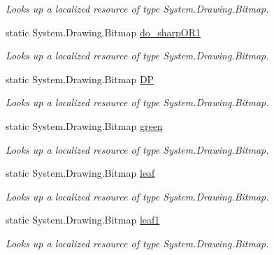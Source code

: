 \begin{DoxyCompactItemize}
\begin{DoxyCompactList}\small\item\em Looks up a localized resource of type System.\+Drawing.\+Bitmap. \end{DoxyCompactList}\item 
static System.\+Drawing.\+Bitmap \hyperlink{classWildlifeTrackingApp_1_1Properties_1_1Resources_ab919b7600d84247495b540af2c9f92be}{do\+\_\+sharp\+O\+R1}
\begin{DoxyCompactList}\small\item\em Looks up a localized resource of type System.\+Drawing.\+Bitmap. \end{DoxyCompactList}\item 
static System.\+Drawing.\+Bitmap \hyperlink{classWildlifeTrackingApp_1_1Properties_1_1Resources_ac755af249e0731fb7bc6227eeebf5f1e}{DP}
\begin{DoxyCompactList}\small\item\em Looks up a localized resource of type System.\+Drawing.\+Bitmap. \end{DoxyCompactList}\item 
static System.\+Drawing.\+Bitmap \hyperlink{classWildlifeTrackingApp_1_1Properties_1_1Resources_a103bcf459cf832b2c7b9d9a7c5ffb55e}{green}
\begin{DoxyCompactList}\small\item\em Looks up a localized resource of type System.\+Drawing.\+Bitmap. \end{DoxyCompactList}\item 
static System.\+Drawing.\+Bitmap \hyperlink{classWildlifeTrackingApp_1_1Properties_1_1Resources_ada97aa4495af0cb5098a56ffbf0f858d}{leaf}
\begin{DoxyCompactList}\small\item\em Looks up a localized resource of type System.\+Drawing.\+Bitmap. \end{DoxyCompactList}\item 
static System.\+Drawing.\+Bitmap \hyperlink{classWildlifeTrackingApp_1_1Properties_1_1Resources_adec538f2d25807e5bde6e710a7ba6204}{leaf1}
\begin{DoxyCompactList}\small\item\em Looks up a localized resource of type System.\+Drawing.\+Bitmap. \end{DoxyCompactList}\item 

\end{DoxyCompactItemize}

